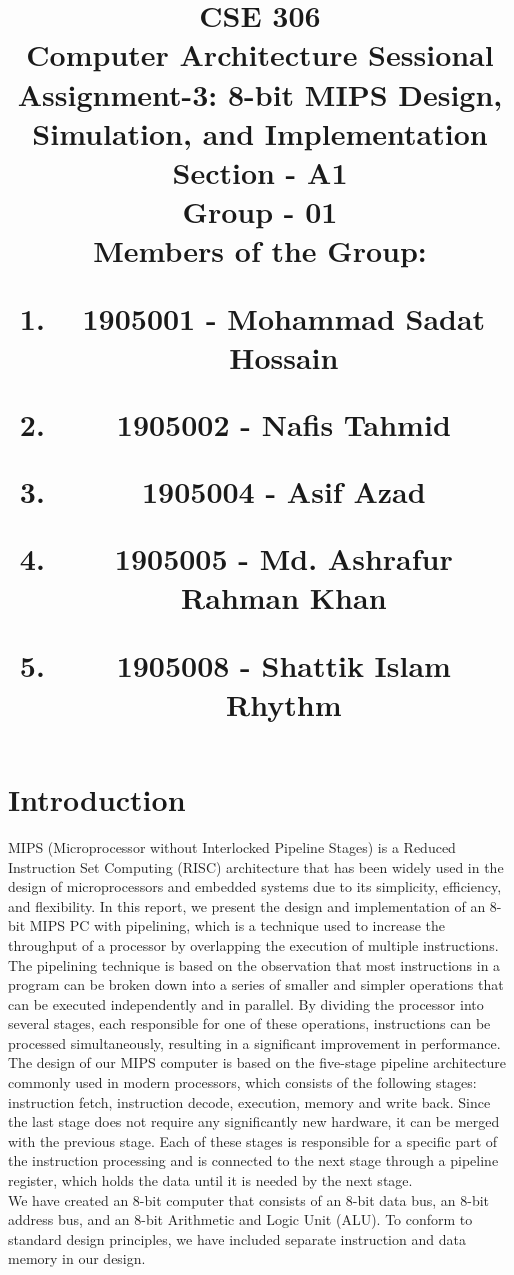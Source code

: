 \documentclass[12pt]{article}
\title{CSE 306 \\
Computer Architecture Sessional \\
\vspace{10mm}
Assignment-3: 8-bit MIPS Design, Simulation, and Implementation \\
\vspace{20mm}
Section - A1 \\
Group - 01 \\
\vspace{15mm}
\RaggedRight
Members of the Group: \\
\normalsize	{
\begin{enumerate}[label=\roman*]
    \item 1905001 - Mohammad Sadat Hossain
    \item 1905002 - Nafis Tahmid
    \item 1905004 - Asif Azad
    \item 1905005 - Md. Ashrafur Rahman Khan
    \item 1905008 - Shattik Islam Rhythm
\end{enumerate}
}
}
\author{}
\date{}
\begin{document}
\maketitle
\newpage
\tableofcontents

\newpage
\section{\large{Introduction}}
MIPS (Microprocessor without Interlocked Pipeline Stages) is a Reduced Instruction Set Computing (RISC) architecture that has been widely used in the design of microprocessors and embedded systems due to its simplicity, efficiency, and flexibility. In this report, we present the design and implementation of an 8-bit MIPS PC with pipelining, which is a technique used to increase the throughput of a processor by overlapping the execution of multiple instructions.\\

The pipelining technique is based on the observation that most instructions in a program can be broken down into a series of smaller and simpler operations that can be executed independently and in parallel. By dividing the processor into several stages, each responsible for one of these operations, instructions can be processed simultaneously, resulting in a significant improvement in performance.\\

The design of our MIPS computer is based on the five-stage pipeline architecture commonly used in modern processors, which consists of the following stages: instruction fetch, instruction decode, execution, memory and write back. Since the last stage does not require any significantly new hardware, it can be merged with the previous stage. Each of these stages is responsible for a specific part of the instruction processing and is connected to the next stage through a pipeline register, which holds the data until it is needed by the next stage.\\

We have created an 8-bit computer that consists of an 8-bit data bus, an 8-bit address bus, and an 8-bit Arithmetic and Logic Unit (ALU). To conform to standard design principles, we have included separate instruction and data memory in our design. 
\end{document}
